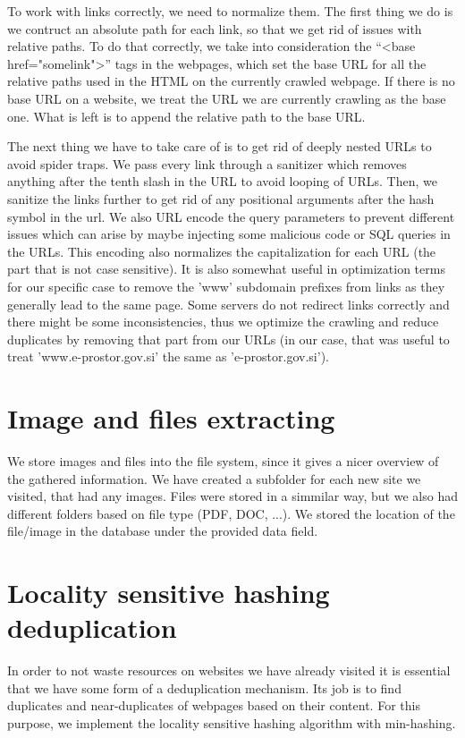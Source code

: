 \documentclass[9pt]{IEEEtran}
\begin{document}
To work with links correctly, we need to normalize them.
The first thing we do is we contruct an absolute path for each link, so that we get rid of issues with relative paths.
To do that correctly, we take into consideration the ``<base href="somelink">'' tags in the webpages, which set the base URL for all the relative paths used in the HTML on the currently crawled webpage.
If there is no base URL on a website, we treat the URL we are currently crawling as the base one.
What is left is to append the relative path to the base URL.

The next thing we have to take care of is to get rid of deeply nested URLs to avoid spider traps.
We pass every link through a sanitizer which removes anything after the tenth slash in the URL to avoid looping of URLs.
Then, we sanitize the links further to get rid of any positional arguments after the hash symbol in the url.
We also URL encode the query parameters to prevent different issues which can arise by maybe injecting some malicious code or SQL queries in the URLs.
This encoding also normalizes the capitalization for each URL (the part that is not case sensitive). It is also somewhat useful in optimization terms for our specific case to remove the 'www' subdomain prefixes from links as they generally lead to the same page. Some servers do not redirect links correctly and there might be some inconsistencies, thus we optimize the crawling and reduce duplicates by removing that part from our URLs (in our case, that was useful to treat 'www.e-prostor.gov.si' the same as 'e-prostor.gov.si').

\section{Image and files extracting}\label{sec:imgFiles}
We store images and files into the file system, since it gives a nicer overview of the gathered information. 
We have created a subfolder for each new site we visited, that had any images.
Files were stored in a simmilar way, but we also had different folders based on file type (PDF, DOC, ...).
We stored the location of the file/image in the database under the provided data field.

\section{Locality sensitive hashing deduplication}\label{sec:lsh}

In order to not waste resources on websites we have already visited it is essential that we have some form of a deduplication mechanism.
Its job is to find duplicates and near-duplicates of webpages based on their content.
For this purpose, we implement the locality sensitive hashing algorithm \cite{Gionis1999} with min-hashing.
\end{document}

